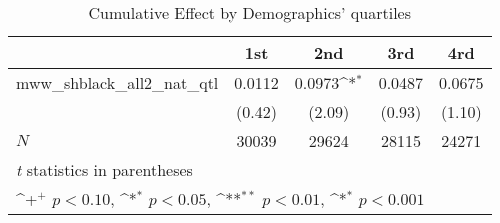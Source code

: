 \begin{table}[htbp]\centering
\def\sym#1{\ifmmode^{#1}\else\(^{#1}\)\fi}
\caption{Cumulative Effect by Demographics' quartiles}
\begin{tabular}{l*{4}{c}}
\hline\hline
            &\multicolumn{1}{c}{1st}&\multicolumn{1}{c}{2nd}&\multicolumn{1}{c}{3rd}&\multicolumn{1}{c}{4rd}\\
\hline
mww\_shblack\_all2\_nat\_qtl&      0.0112       &      0.0973\sym{*}&      0.0487       &      0.0675       \\
            &      (0.42)       &      (2.09)       &      (0.93)       &      (1.10)       \\
\hline
\(N\)       &       30039       &       29624       &       28115       &       24271       \\
\hline\hline
\multicolumn{5}{l}{\footnotesize \textit{t} statistics in parentheses}\\
\multicolumn{5}{l}{\footnotesize \sym{+} \(p<0.10\), \sym{*} \(p<0.05\), \sym{**} \(p<0.01\), \sym{*} \(p<0.001\)}\\
\end{tabular}
\end{table}
